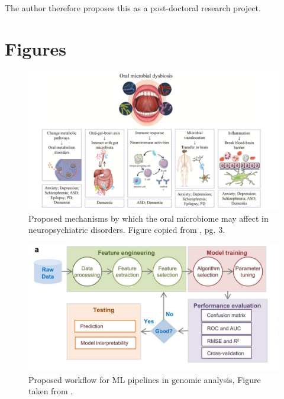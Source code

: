\documentclass{article}
\begin{document}
\begin{multicols}{2}
The author therefore proposes this as a post-doctoral research project.



\end{multicols}
\newpage
\section{Figures}
\begin{figure}[h]
\includegraphics[width = \textwidth]{../figures/dysbiosis-oral-diagram.png}
\caption{Proposed mechanisms by which the oral microbiome may affect in neuropsychiatric disorders. Figure copied from \cite{tao_relationship_2024}, pg. 3.}
\end{figure}\label{mouth}
\begin{figure}[h]
\begin{center}
\includegraphics[width = \textwidth]{../figures/ml-workflow}
\caption{Proposed workflow for ML pipelines in genomic analysis, Figure taken from \cite{li_machine_2022}.}
\end{center}
\end{figure}\label{mouth}
\end{document}
